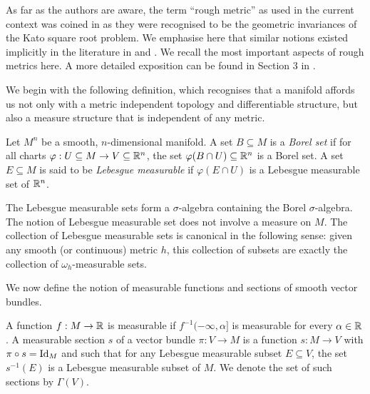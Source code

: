 \documentclass[a4paper, 12pt]{amsart}
\begin{document}
As far as the authors are aware, the term ``rough metric'' as used in the current context 
was coined in \cite{BRough} as they were 
recognised to be the geometric invariances of the Kato square root problem.
We emphasise here that similar notions existed implicitly in the 
literature  in \cite{Norris} 
and \cite{SC}.
We recall the most important aspects of rough metrics here. 
A more detailed exposition can be found in Section 3 in \cite{BRough}.

We begin with the following definition, which recognises
that a manifold affords us not only with a metric independent 
topology and differentiable structure, but also a measure
structure that is independent of any metric.

\begin{defn}
\label{defn:borel_lebesgue}
Let \(M^n\) be a smooth, \(n\)-dimensional manifold. A set \(B \subseteq M\) is a \emph{Borel set} if for all charts \(\varphi : U \subseteq M \to V \subseteq \mathbb{R}^n\), the set \(\varphi(B \cap U) \subseteq \mathbb{R}^n\) is a Borel set. A set \(E \subseteq M\) is said to be \emph{Lebesgue measurable} if \(\varphi(E \cap U)\) is a Lebesgue measurable set of \(\mathbb{R}^n\).
\end{defn}

\begin{rem}
The Lebesgue measurable sets form a \(\sigma\)-algebra containing the Borel \(\sigma\)-algebra. The notion of Lebesgue measurable set does not involve a measure on \(M\). The collection of Lebesgue measurable sets is canonical in the following sense: given any smooth (or continuous) metric $h$, this collection of subsets are exactly the collection of $\omega_h$-measurable sets.
\end{rem}

We now define the notion of measurable functions and sections of smooth vector bundles.

\begin{defn}
A function $f: M \to \mathbb{R}$ is measurable if $f^{-1}(-\infty, \alpha]$ is measurable for every $\alpha  \in \mathbb{R}$. A measurable section \(s\) of a vector bundle \(\pi : V \to M\) is a function \(s: M \to V\) with \(\pi \circ s = \operatorname{Id}_M\) and such that for any Lebesgue measurable subset \(E \subseteq V\), the set \(s^{-1}(E)\) is a Lebesgue measurable subset of \(M\).  We denote the set of such sections by $\Gamma(V)$.
\end{defn}
\end{document}

